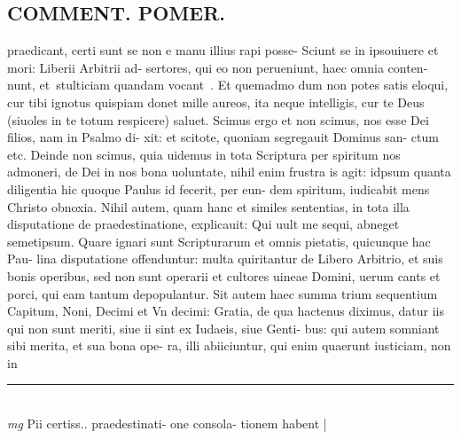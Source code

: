 \documentclass{article}
\begin{document}
\begin{pages}
\section*{COMMENT. POMER.  }\pstart praedicant, certi sunt se non e manu illius rapi posse- Sciunt se in ipsouiuere et mori: Liberii Arbitrii ad- sertores, qui eo non perueniunt, haec omnia conten- nunt, et stulticiam quandam vocant . Et quemadmo dum non potes satis eloqui, cur tibi ignotus quispiam donet mille aureos, ita neque intelligis, cur te Deus (siuoles in te totum respicere) saluet. Scimus ergo et non scimus, nos esse Dei filios, nam in Psalmo di- xit: et scitote, quoniam segregauit Dominus san- ctum etc. Deinde non scimus, quia uidemus in tota Scriptura per spiritum nos admoneri, de Dei in nos bona uoluntate, nihil enim frustra is agit: idpsum quanta diligentia hic quoque Paulus id fecerit, per eun- dem spiritum, iudicabit mens Christo obnoxia. Nihil autem, quam hanc et similes sententias, in tota illa disputatione de praedestinatione, explicauit: Qui uult me sequi, abneget semetipsum. Quare ignari sunt Scripturarum et omnis pietatis, quicunque hac Pau- lina disputatione offenduntur: multa quiritantur de Libero Arbitrio, et suis bonis operibus, sed non sunt operarii et cultores uineae Domini, uerum cants et porci, qui eam tantum depopulantur. Sit autem haec summa trium sequentium Capitum, Noni, Decimi et Vn decimi: Gratia, de qua hactenus diximus, datur iis qui non sunt meriti, siue ii sint ex Iudaeis, siue Genti- bus: qui autem somniant sibi merita, et sua bona ope- ra, illi abiiciuntur, qui enim quaerunt iusticiam, non in  \pend
\vspace{0.5cm}\noindent
\vspace{0.2cm}\rule{1cm}{0.2pt}\\ 
\hspace{0.2cm}\textit{mg}
\footnotesize Pii certiss.. praedestinati- one consola- tionem habent 
\normalsize| 

\end{pages}
\end{document}

